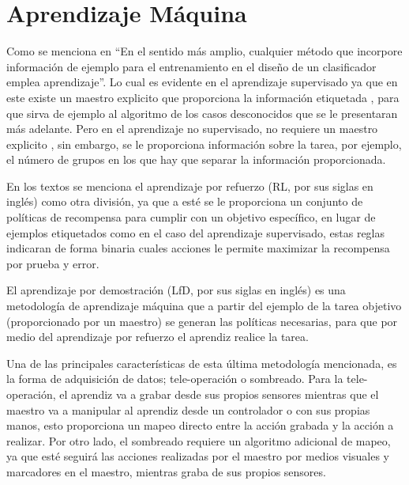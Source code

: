 \section{Aprendizaje M\'aquina}

Como se menciona en \cite{9780471056690} ``En el sentido m\'as amplio,
 cualquier m\'etodo que incorpore informaci\'on de ejemplo para el 
 entrenamiento en el dise\~no de un clasificador emplea aprendizaje''.
 Lo cual es evidente en el aprendizaje supervisado ya que en este existe 
 un maestro explicito que proporciona la informaci\'on etiquetada
 \cite{9780471056690}, para que sirva de ejemplo al algoritmo de los casos 
 desconocidos que se le presentaran m\'as adelante. Pero en el aprendizaje 
 no supervisado, no requiere un maestro explicito \cite{9780471056690}, sin 
 embargo, se le proporciona informaci\'on sobre la tarea, por ejemplo, el 
 n\'umero de grupos en los que hay que separar la informaci\'on proporcionada.


En los textos \cite{9780471056690, 9780387310732} se menciona el aprendizaje 
 por refuerzo (RL, por sus siglas en ingl\'es) como otra divisi\'on, ya que 
 a est\'e se le proporciona un conjunto de pol\'iticas de recompensa para 
 cumplir con un objetivo espec\'ifico, en lugar de ejemplos etiquetados como 
 en el caso del aprendizaje supervisado, estas reglas indicaran de forma 
 binaria cuales acciones le permite maximizar la recompensa por prueba y error.


El aprendizaje por demostraci\'on (LfD, por sus siglas en ingl\'es)
 \cite{ARGALL2009469} es una metodolog\'ia de aprendizaje m\'aquina que a 
 partir del ejemplo de la tarea objetivo (proporcionado por un maestro) 
 se generan las pol\'iticas necesarias, para que por medio del aprendizaje 
 por refuerzo el aprendiz realice la tarea. 


Una de las principales caracter\'isticas de esta \'ultima metodolog\'ia
 mencionada, es la forma de adquisici\'on de datos; tele-operaci\'on o 
 sombreado. Para la tele-operaci\'on\cite{ARGALL2009469}, el aprendiz va 
 a grabar desde sus propios sensores mientras que el maestro va a manipular 
 al aprendiz desde un controlador o con sus propias manos, esto proporciona 
 un mapeo directo entre la acci\'on grabada y la acci\'on a realizar. Por 
 otro lado, el sombreado\cite{ARGALL2009469} requiere un algoritmo adicional 
 de mapeo, ya que est\'e seguir\'a las acciones realizadas por el maestro por 
 medios visuales y marcadores en el maestro, mientras graba de sus propios 
 sensores. 


